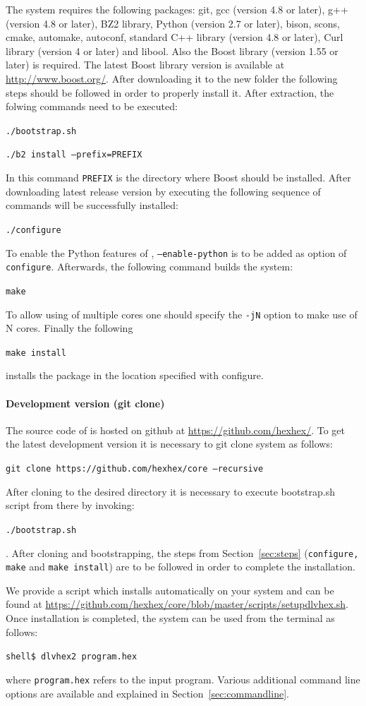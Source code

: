 \documentclass[14pt,a4paper, titlepage]{article}
\begin{document}
The system requires the following packages: git, gcc 
(version 4.8 or later), g++ (version 4.8 or later), BZ2 
library, Python (version 2.7 or later), bison, scons, 
cmake, automake, autoconf, standard C++ library (version 
4.8 or later), Curl library (version 4 or later) and 
libool. Also the Boost library (version 1.55 or later) is 
required. The latest Boost library version is available at 
\url{http://www.boost.org/}. After downloading it to the 
new folder the following steps should be followed in order 
to properly install it. After extraction, the folwing 
commands need to be executed:
\\ \centerline{\texttt{./bootstrap.sh}}
\centerline{\texttt{./b2 install --prefix=PREFIX}} In this 
command \texttt{PREFIX} is the directory where Boost should 
be installed. After downloading latest release version by 
executing the following sequence of commands \dlvhex{} will 
be successfully installed:
\\ \centerline{\texttt{./configure}} To enable the Python 
features of \dlvhex{}, \texttt{--enable-python} is to be 
added as option of \texttt{configure}. Afterwards, the 
following command builds the system:
\\ \centerline{\texttt{make}} To allow using of multiple 
cores one should specify the \texttt{-jN} option to make 
use of N cores. Finally the following
\\ \centerline{\texttt{make install}} installs the package 
in the location specified with configure.  
   
\paragraph{Development version (git clone)}
The source code of \dlvhex{} is hosted on github at 
\url{https://github.com/hexhex/}. To get the latest 
development version it is necessary to git clone system as 
follows:
\\ \centerline{\texttt{git clone 
https://github.com/hexhex/core --recursive}} 
After cloning to the desired directory it is necessary to 
execute bootstrap.sh script from there by invoking: \\ 
\centerline{\texttt{./bootstrap.sh}}. 
After cloning and bootstrapping, the steps from 
Section~\ref{sec:steps} (\texttt{configure, make} and 
\texttt{make install}) are to be followed in order to 
complete the installation.

We provide a script which installs \dlvhex{} 
automatically on your system and can be found at 
\url{https://github.com/hexhex/core/blob/master/scripts/setupdlvhex.sh}.
Once installation is completed, the system can be used from 
the terminal as follows:\\ 
\centerline{\texttt{shell\$ dlvhex2 program.hex}} where 
\texttt{program.hex} refers to the input program. Various 
additional command line options are available and explained in Section~\ref{sec:commandline}.    
\end{document}
